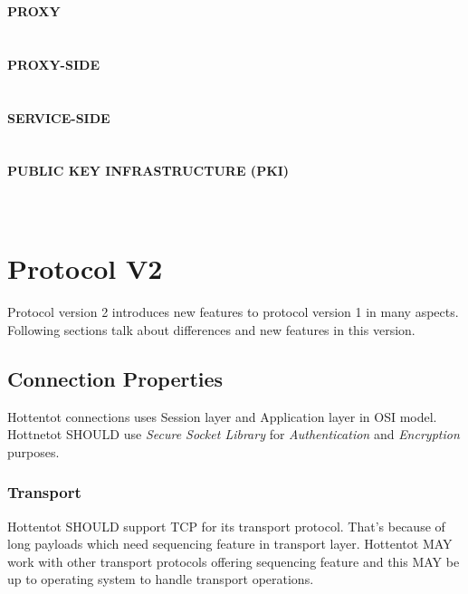 \documentclass[10pt,a4paper]{article}
\begin{document}
  \textbf {PROXY} \\  \\\\
  \textbf {PROXY-SIDE} \\  \\\\
  \textbf {SERVICE-SIDE} \\  \\\\
  \textbf{PUBLIC KEY INFRASTRUCTURE (PKI)} \\  \\\\

\section{Protocol V2}
Protocol version 2 introduces new features to protocol version 1 in many aspects. Following sections talk about differences and new features in this version.

\subsection{Connection Properties}
Hottentot connections uses Session layer and Application layer in OSI model. Hottnetot SHOULD use \textit {Secure Socket Library} for \textit{Authentication} and \textit{Encryption} purposes.

\subsubsection{Transport}
Hottentot SHOULD support TCP for its transport protocol. That's because of long payloads which need sequencing feature in transport layer. Hottentot MAY work with other transport protocols offering sequencing feature and this MAY be up to operating system to handle transport operations.
\end{document}
